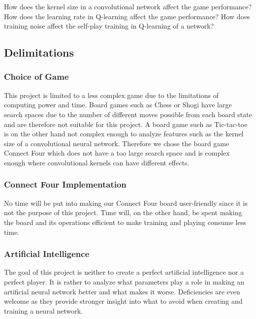\documentclass[titlepage]{article}
\begin{document}
\begin{outline}
    \1 How does the kernel size in a convolutional network affect the game performance? 
    \1 How does the learning rate in Q-learning affect the game performance? 
    \1 How does training noise affect the self-play training in Q-learning of a network?
\end{outline}

\newpage

\subsection{Delimitations}

\vskip 0.2cm

\subsubsection{Choice of Game}

\vskip 0.2cm

This project is limited to a less complex game due to the limitations of computing power and time. Board games such as Chess or Shogi have large search spaces due to the number of different moves possible from each board state and are therefore not suitable for this project. A board game such as Tic-tac-toe is on the other hand not complex enough to analyze features such as the kernel size of a convolutional neural network. Therefore we chose the board game Connect Four which does not have a too large search space and is complex enough where convolutional kernels can have different effects. 

\subsubsection{Connect Four Implementation}

\vskip 0.2cm

No time will be put into making our Connect Four board user-friendly since it is not the purpose of this project. Time will, on the other hand, be spent making the board and its operations efficient to make training and playing consume less time. 

\subsubsection{Artificial Intelligence}

\vskip 0.2cm

The goal of this project is neither to create a perfect artificial intelligence nor a perfect player. It is rather to analyze what parameters play a role in making an artificial neural network better and what makes it worse. Deficiencies are even welcome as they provide stronger insight into what to avoid when creating and training a neural network. 
\end{document}
